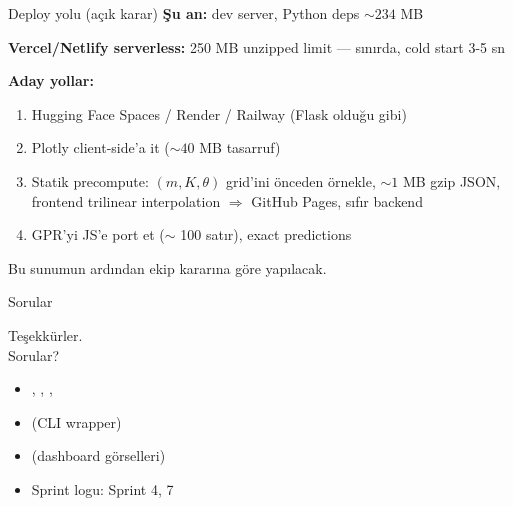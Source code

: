 \begin{frame}{Deploy yolu (açık karar)}
  \textbf{Şu an:}  dev server, Python deps \(\sim 234\) MB

  \vspace{0.3cm}
  \textbf{Vercel/Netlify serverless:} 250 MB unzipped limit --- sınırda,
  cold start 3-5 sn

  \vspace{0.4cm}
  \textbf{Aday yollar:}
  \begin{enumerate}\small
    \item Hugging Face Spaces / Render / Railway (Flask olduğu gibi)
    \item Plotly client-side'a it (\(\sim 40\) MB tasarruf)
    \item \alert{Statik precompute:} \((m, K, \theta)\) grid'ini önceden
          örnekle, \(\sim 1\) MB gzip JSON, frontend trilinear interpolation
          \(\Rightarrow\) GitHub Pages, sıfır backend
    \item GPR'yi JS'e port et (\(\sim\) 100 satır), exact predictions
  \end{enumerate}

  \vspace{0.3cm}
  Bu sunumun ardından ekip kararına göre yapılacak.
\end{frame}

\begin{frame}{Sorular}
  \vfill
  \begin{center}
    \Large Teşekkürler.\\[0.4cm]
    \normalsize Sorular?
  \end{center}
  \vfill
  \scriptsize
  \begin{itemize}
    \item {}, , , 
    \item {} (CLI wrapper)
    \item {} (dashboard görselleri)
    \item Sprint logu:  Sprint 4, 7
  \end{itemize}
\end{frame}



